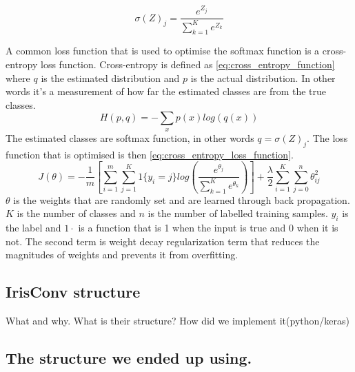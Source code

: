 \begin{equation}
\label{eq:softmax_activation_function}
\sigma(Z)_{j} = \frac{e^{Z_j}}{\sum_{k=1}^{K}e^{Z_k}}
\end{equation}

A common loss function that is used to optimise the softmax function is a cross-entropy loss function. Cross-entropy is defined as \autoref{eq:cross_entropy_function} where $q$ is the estimated distribution and $p$ is the actual distribution. In other words it's a measurement of how far the estimated classes are from the true classes.
\begin{equation}
\label{eq:cross_entropy_function}
H(p,q) = -\sum_{x}p(x)log(q(x))
\end{equation}
The estimated classes are softmax function, in other words $q = \sigma(Z)_{j} $. The loss function that is optimised is then \autoref{eq:cross_entropy_loss_function}.
\begin{equation}
\label{eq:cross_entropy_loss_function}
J(\theta) = -\frac{1}{m}\left[ \sum_{i=1}^{m}\sum_{j=1}^{K} 1\{y_i=j\}  log\left( \frac{e^{\theta_j}}{\sum_{k=1}^{K}e^{\theta_k}} \right)\right] + \frac{\lambda}{2} \sum_{i=1}^{K} \sum_{j=0}^{n} \theta_{ij}^{2}
\end{equation}
$\theta$ is the weights that are randomly set and are learned through back propagation. $K$ is the number of classes and $n$ is the number of labelled training samples. $y_i$ is the label and $1{\cdot}$ is a function that is 1 when the input is true and 0 when it is not. The second term is weight decay regularization term that reduces the magnitudes of weights and prevents it from overfitting.


\subsection{IrisConv structure}
What and why. What is their structure? How did we implement it(python/keras)

\subsection{The structure we ended up using.}
